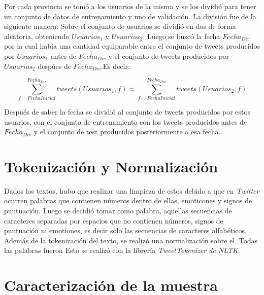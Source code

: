 Por cada provincia se tomó a los usuarios de la misma y se los dividió para tener un conjunto de datos de entrenamiento y uno de validación.
La división fue de la siguiente manera:
Sobre el conjunto de usuarios se dividió en dos de forma aleatoria, obteniendo $Usuarios_1$ y $Usuarios_2$. Luego se buscó la fecha $Fecha_{Div}$ por la cual había una cantidad equiparable entre el conjunto de tweets producidos por  $Usuarios_1$ antes de $Fecha_{Div}$ y el conjunto de tweets producidos por $Usuarios_2$ despúes de $Fecha_{Div}$.Es decir:

\begin{equation}
\sum_{ f = FechaInicial}^{Fecha_{Div}} tweets(Usuarios_1,f) \approx \sum_{ f = FechaInicial}^{Fecha_{Div}} tweets(Usuarios_2,f) 
\end{equation}

Después de saber la fecha se dividió al conjunto de tweets producidos por estos usuarios, con el conjunto de entrenamiento con los tweets producidos antes de $Fecha_{Div}$ y el conjunto de test producidos posteriormente a esa fecha.

\section{Tokenización y Normalización}
Dados los textos, hubo que realizar una limpieza de estos debido a que en \textit{Twitter} ocurren palabras que contienen números dentro de ellas, emoticones y signos de puntuación. Luego se decidió tomar como palabra, aquellas secuencias de caracteres separadas por espacios que no contienen números, signos de puntuación ni emotiones, es decir solo las secuencias de caracteres alfabéticos. 
Además de la tokenización del texto, se realizó una normalización sobre el. Todas las palabras fueron Esto se realizó con la librería \textit{TweetTokenizer de NLTK}. 

\section{Caracterización de la muestra}




%